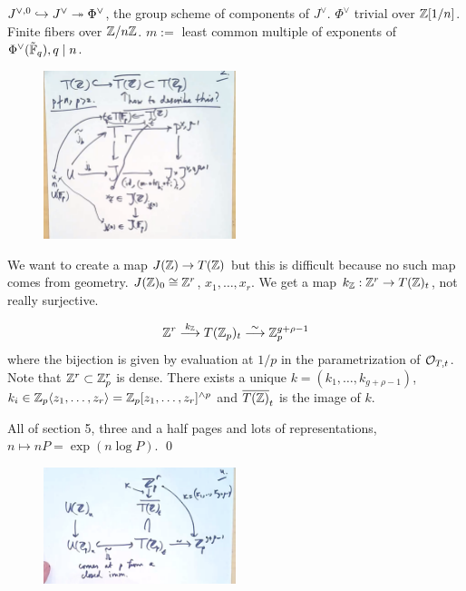 $J^{\vee,0} \hookrightarrow J^\vee \twoheadrightarrow \Phi^\vee$, the group scheme of components of $J^\vee$. $\Phi^\vee$ trivial over $\mathbb{Z}[1/n]$. Finite \et fibers over $\mathbb{Z}/n\mathbb{Z}$. $m:=$ least common multiple of exponents of $\Phi^\vee(\tilde{\mathbb{F}}_q), q \mid n$. 


	\begin{figure}[!ht]
	\centering
	\includegraphics[width=0.5\textwidth]{../images/im15.png}
	\end{figure}


We want to create a map $J(\mathbb{Z}) \to T(\mathbb{Z})$ but this is difficult because no such map comes from geometry. $J(\mathbb{Z})_0 \cong \mathbb{Z}^r$, $x_1, \ldots, x_r$. We get a map $k_{\mathbb{Z}}: \mathbb{Z}^r \to T(\mathbb{Z})_t$, not really surjective.


\begin{thm}[4.10]
	\[
	\mathbb{Z}^r \stackrel{k_{\mathbb{Z}}}{\longrightarrow} T(\mathbb{Z}_p)_t \stackrel{\sim}{\longrightarrow} \mathbb{Z}_p^{g+\rho-1}
	\]
where the bijection is given by evaluation at $1/p$ in the parametrization of $\mathcal{O}_{T,t}$. Note that $\mathbb{Z}^r \subset \mathbb{Z}_p^r$ is dense. There exists a unique $k=(k_1,\ldots,k_{g+\rho-1})$, $k_i \in \mathbb{Z}_p \langle z_1,\ldots,z_r \rangle= \mathbb{Z}_p[z_1,\ldots,z_r]^{\wedge p}$ and $\overline{T(\mathbb{Z})}_t$ is the image of $k$. 
\end{thm}

\pf All of section 5, three and a half pages and lots of representations, $n \mapsto nP = \exp(n \log P)$. \qed \\


	\begin{figure}[!ht]
	\centering
	\includegraphics[width=0.5\textwidth]{../images/im16.png}
	\end{figure}


